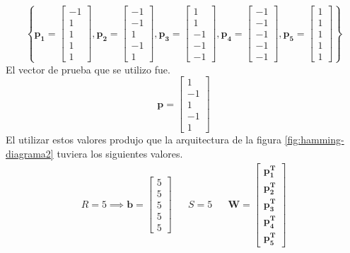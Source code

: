 \[ \left\lbrace \boldsymbol{p_1} = \left[\begin{array}{c}-1\\ 1\\ 1 \\ 1 \\ 1 \end{array}\right], \boldsymbol{p_2} = \left[\begin{array}{c}-1\\ -1\\ 1 \\ -1 \\ 1 \end{array}\right], \boldsymbol{p_3} = \left[\begin{array}{c}1\\ 1\\ -1 \\ -1 \\ -1 \end{array}\right], \boldsymbol{p_4} = \left[\begin{array}{c}-1\\ -1\\ -1 \\ -1 \\ -1 \end{array}\right], \boldsymbol{p_5} = \left[\begin{array}{c}1\\ 1\\ 1 \\ 1 \\ 1 \end{array}\right] \right\rbrace \]
El vector de prueba que se utilizo fue.
\[ \boldsymbol{p} = \left[\begin{array}{c}1\\ -1\\ 1 \\ -1 \\ 1\end{array}\right] \]
El utilizar estos valores produjo que la arquitectura de la figura \ref{fig:hamming-diagrama2} tuviera los siguientes valores.
\begin{align*}
R = 5 \implies \boldsymbol{b} = \left[\begin{array}{c}5 \\5 \\ 5 \\ 5 \\ 5\end{array}\right] && S = 5 && \boldsymbol{W} = \left[\begin{array}{c}\boldsymbol{p^{T}_1}\\ \boldsymbol{p^{T}_2} \\ \boldsymbol{p^{T}_3} \\ \boldsymbol{p^{T}_4} \\ \boldsymbol{p^{T}_5}\end{array}\right]
\end{align*}
